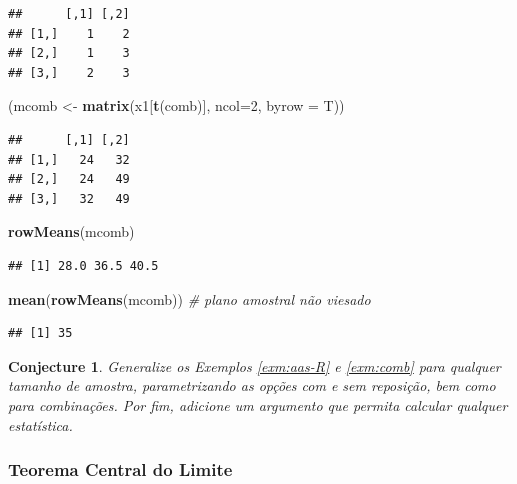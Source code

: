 \documentclass[
]{book}
\newenvironment{Shaded}{\begin{snugshade}}{\end{snugshade}}
\newcommand{\CommentTok}[1]{\textcolor[rgb]{0.56,0.35,0.01}{\textit{#1}}}
\newcommand{\DataTypeTok}[1]{\textcolor[rgb]{0.13,0.29,0.53}{#1}}
\newcommand{\DecValTok}[1]{\textcolor[rgb]{0.00,0.00,0.81}{#1}}
\newcommand{\KeywordTok}[1]{\textcolor[rgb]{0.13,0.29,0.53}{\textbf{#1}}}
\newcommand{\NormalTok}[1]{#1}
\newcommand{\StringTok}[1]{\textcolor[rgb]{0.31,0.60,0.02}{#1}}
\newtheorem{conjecture}{Conjecture}[chapter]
\theoremstyle{definition}
\theoremstyle{definition}
\theoremstyle{definition}
\theoremstyle{remark}
\begin{document}
\begin{verbatim}
##      [,1] [,2]
## [1,]    1    2
## [2,]    1    3
## [3,]    2    3
\end{verbatim}

\begin{Shaded}
\begin{Highlighting}[]
\NormalTok{(mcomb \textless{}{-}}\StringTok{ }\KeywordTok{matrix}\NormalTok{(x1[}\KeywordTok{t}\NormalTok{(comb)], }\DataTypeTok{ncol=}\DecValTok{2}\NormalTok{, }\DataTypeTok{byrow =}\NormalTok{ T))}
\end{Highlighting}
\end{Shaded}

\begin{verbatim}
##      [,1] [,2]
## [1,]   24   32
## [2,]   24   49
## [3,]   32   49
\end{verbatim}

\begin{Shaded}
\begin{Highlighting}[]
\KeywordTok{rowMeans}\NormalTok{(mcomb)}
\end{Highlighting}
\end{Shaded}

\begin{verbatim}
## [1] 28.0 36.5 40.5
\end{verbatim}

\begin{Shaded}
\begin{Highlighting}[]
\KeywordTok{mean}\NormalTok{(}\KeywordTok{rowMeans}\NormalTok{(mcomb)) }\CommentTok{\# plano amostral não viesado}
\end{Highlighting}
\end{Shaded}

\begin{verbatim}
## [1] 35
\end{verbatim}

\begin{conjecture}
\protect\hypertarget{cnj:unnamed-chunk-69}{}{\label{cnj:unnamed-chunk-69} }Generalize os Exemplos \ref{exm:aas-R} e \ref{exm:comb} para qualquer tamanho de amostra, parametrizando as opções com e sem reposição, bem como para combinações. Por fim, adicione um argumento que permita calcular qualquer estatística.
\end{conjecture}

\hypertarget{teorema-central-do-limite}{%
\subsubsection*{Teorema Central do Limite}\label{teorema-central-do-limite}}
\end{document}
